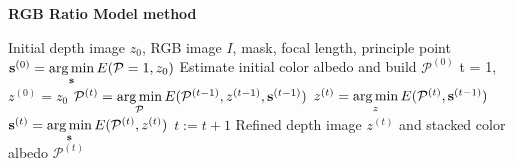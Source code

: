 \begin{algorithm}[!htbp]
	\begin{algorithmic}[1]
  		\caption{\textbf{RGB Ratio Model method}}
		\label{alg:rgb_ratio}
		 \renewcommand{\algorithmicrequire}{\textbf{Input:}}
		 \renewcommand{\algorithmicensure}{\textbf{Output:}}
		 \REQUIRE Initial depth image $z_0$, RGB image $I$, mask, focal length, principle point
		 \vspace{1.8mm}
		 \STATE $\mathbf{s}^{(0)} = \operatorname*{arg\,min} \limits_{\mathbf{s}} E(\mathcal{P} =1, z_0)$ 
		 \STATE Estimate initial color albedo and build $\mathcal{P}^{(0)}$  
		 \STATE t = 1, $z^{(0)} = z_0$
		 \vspace{1.8mm}
		   \vspace{1.8mm}
			\STATE $\mathcal{P}^{(t)} = \operatorname*{arg\,min} \limits_{\mathcal{P}} E(\mathcal{P}^{(t-1)}, z^{(t-1)}, \mathbf{s}^{(t-1)})$ 
			  \STATE $z^{(t)} = \operatorname*{arg\,min} \limits_{z} E(\mathcal{P}^{(t)}, \mathbf{s}^{(t-1)})$ 
			  \STATE $\mathbf{s}^{(t)} = \operatorname*{arg\,min} \limits_{\mathbf{s}} E(\mathcal{P}^{(t)}, z^{(t)})$ 
			  \vspace{1.8mm}
		          \STATE $t := t + 1$
		 \vspace{1.8mm}
		  \ENDWHILE
		  \ENSURE  Refined depth image $z^{(t)}$ and stacked color albedo $\mathcal{P}^{(t)}$
	\end{algorithmic}
\end{algorithm}

